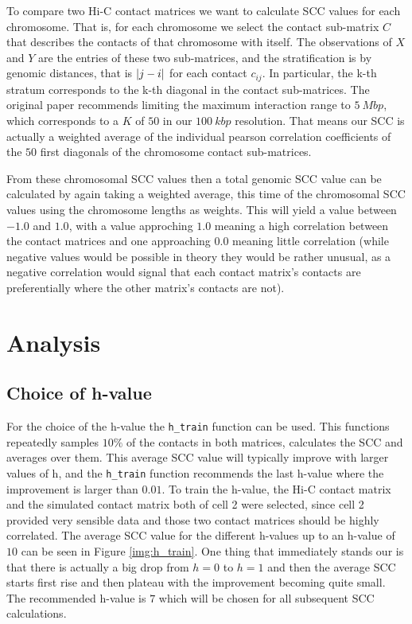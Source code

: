 \documentclass[10pt,abstract=true,titlepage=false,toc=bib]{scrartcl}
\begin{document}
To compare two Hi-C contact matrices we want to calculate SCC values for each chromosome. That is, for each chromosome we select the contact sub-matrix \(C\) that describes the contacts of that chromosome with itself. The observations of \(X\) and \(Y\) are the entries of these two sub-matrices, and the stratification is by genomic distances, that is \(\abs{j-i}\) for each contact \(c_{ij}\). In particular, the k-th stratum corresponds to the k-th diagonal in the contact sub-matrices. The original paper recommends limiting the maximum interaction range to \(\SI{5}{Mbp}\), which corresponds to a \(K\) of \(50\) in our \(\SI{100}{kbp}\) resolution. That means our SCC is actually a weighted average of the individual pearson correlation coefficients of the \(50\) first diagonals of the chromosome contact sub-matrices.

From these chromosomal SCC values then a total genomic SCC value can be calculated by again taking a weighted average, this time of the chromosomal SCC values using the chromosome lengths as weights. This will yield a value between \(-1.0\) and \(1.0\), with a value approching \(1.0\) meaning a high correlation between the contact matrices and one approaching \(0.0\) meaning little correlation (while negative values would be possible in theory they would be rather unusual, as a negative correlation would signal that each contact matrix's contacts are preferentially where the other matrix's contacts are not).



\section{Analysis} %
\label{sec:analysis}

\subsection{Choice of h-value} %
\label{sub:choice_of_h_value}

For the choice of the h-value the \verb|h_train| function can be used. This functions repeatedly samples \(10\%\) of the contacts in both matrices, calculates the SCC and averages over them. This average SCC value will typically improve with larger values of h, and the \verb|h_train| function recommends the last h-value where the improvement is larger than \(0.01\). To train the h-value, the Hi-C contact matrix and the simulated contact matrix both of cell 2 were selected, since cell 2 provided very sensible data and those two contact matrices should be highly correlated. The average SCC value for the different h-values up to an h-value of \(10\) can be seen in Figure \ref{img:h_train}. One thing that immediately stands our is that there is actually a big drop from \(h=0\) to \(h=1\) and then the average SCC starts first rise and then plateau with the improvement becoming quite small. The recommended h-value is \(7\) which will be chosen for all subsequent SCC calculations.
\end{document}
